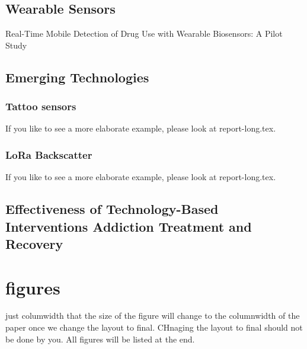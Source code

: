 \documentclass[sigconf]{acmart}
\begin{document}
\subsection{Wearable Sensors}

Real-Time Mobile Detection of Drug Use with Wearable Biosensors:
A Pilot Study
\cite{carreiro15}

\subsection{Emerging Technologies}

\subsubsection{Tattoo sensors}

If you like to see a more elaborate example, please look at
report-long.tex. 


\subsubsection{LoRa Backscatter}

If you like to see a more elaborate example, please look at
report-long.tex. 


\subsection{Effectiveness of Technology-Based Interventions Addiction Treatment and Recovery}


\section{figures}

just columwidth that the size of the figure will change to the
columnwidth of the paper once we change the layout to final. CHnaging
the layout to final should not be done by you. All figures will be
listed at the end.

\end{document}

